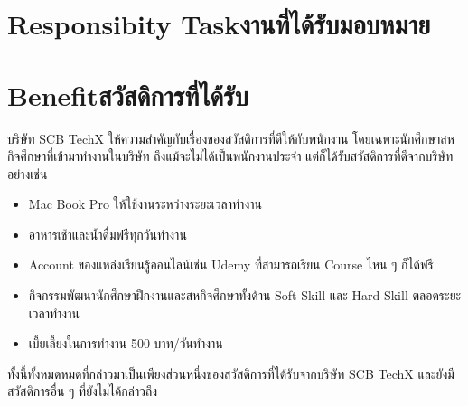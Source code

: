 \section{\ifenglish Responsibity Task\else งานที่ได้รับมอบหมาย\fi}

\section{\ifenglish Benefit\else สวัสดิการที่ได้รับ\fi}
บริษัท SCB TechX ให้ความสำคัญกับเรื่องของสวัสดิการที่ดีให้กับพนักงาน โดยเฉพาะนักศึกษาสหกิจศึกษาที่เข้ามาทำงานในบริษัท
ถึงแม้จะไม่ได้เป็นพนักงานประจำ แต่ก็ได้รับสวัสดิการที่ดีจากบริษัทอย่างเช่น
\begin{itemize}
      \item Mac Book Pro ให้ใช้งานระหว่างระยะเวลาทำงาน
      \item อาหารเช้าและน้ำดื่มฟรีทุกวันทำงาน
      \item Account ของแหล่งเรียนรู้ออนไลน์เช่น Udemy ที่สามารถเรียน Course ไหน ๆ ก็ได้ฟรี
      \item กิจกรรมพัฒนานักศึกษาฝึกงานและสหกิจศึกษาทั้งด้าน Soft Skill และ Hard Skill ตลอดระยะเวลาทำงาน
      \item เบี้ยเลี้ยงในการทำงาน 500 บาท/วันทำงาน
\end{itemize}
ทั้งนี้ทั้งหมดหมดที่กล่าวมาเป็นเพียงส่วนหนึ่งของสวัสดิการที่ได้รับจากบริษัท SCB TechX และยังมีสวัสดิการอื่น ๆ ที่ยังไม่ได้กล่าวถึง